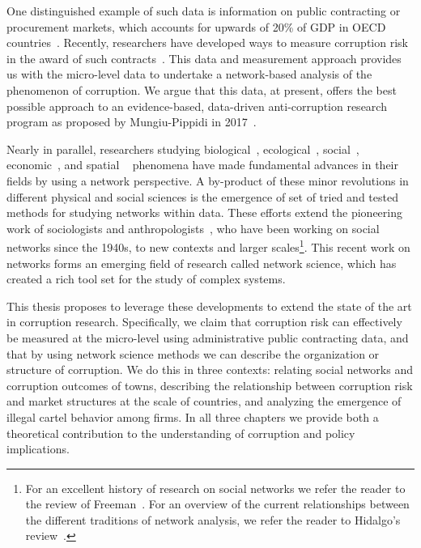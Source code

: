 One distinguished example of such data is information on public contracting or procurement markets, which accounts for upwards of 20\% of GDP in OECD countries~\cite{oecdprocurement}. Recently, researchers have developed ways to measure corruption risk in the award of such contracts~\cite{fazekas2016corruption,fazekas2017uncovering}. This data and measurement approach provides us with the micro-level data to undertake a network-based analysis of the phenomenon of corruption. We argue that this data, at present, offers the best possible approach to an evidence-based, data-driven anti-corruption research program as proposed by Mungiu-Pippidi in 2017~\cite{mungiu2017time}.

Nearly in parallel, researchers studying biological~\cite{alm2003biological}, ecological~\cite{ings2009ecological}, social~\cite{borgatti2018analyzing}, economic~\cite{schweitzer2009economic,jackson2010social}, and spatial ~\cite{barthelemy2011spatial} phenomena have made fundamental advances in their fields by using a network perspective. A by-product of these minor revolutions in different physical and social sciences is the emergence of set of tried and tested methods for studying networks within data. These efforts extend the pioneering work of sociologists and anthropologists~\cite{moreno1941foundations,freeman1978centrality,wasserman1994social}, who have been working on social networks since the 1940s, to new contexts and larger scales\footnote{For an excellent history of research on social networks we refer the reader to the review of Freeman~\cite{freeman1996some}. For an overview of the current relationships between the different traditions of network analysis, we refer the reader to Hidalgo's review~\cite{hidalgo2016disconnected}.}. This recent work on networks forms an emerging field of research called network science, which has created a rich tool set for the study of complex systems.


This thesis proposes to leverage these developments to extend the state of the art in corruption research. Specifically, we claim that corruption risk can effectively be measured at the micro-level using administrative public contracting data, and that by using network science methods we can describe the organization or structure of corruption. We do this in three contexts: relating social networks and corruption outcomes of towns, describing the relationship between corruption risk and market structures at the scale of countries, and analyzing the emergence of illegal cartel behavior among firms. In all three chapters we provide both a theoretical contribution to the understanding of corruption and policy implications. 

